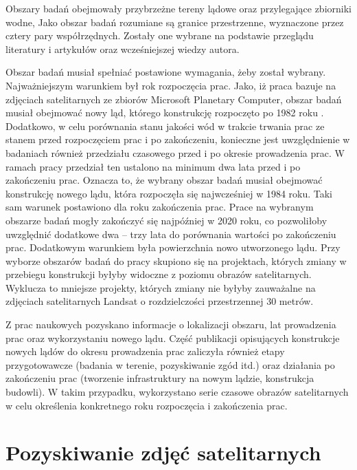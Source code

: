 \documentclass{amuthesis}
\begin{document}
Obszary badań obejmowały przybrzeżne tereny lądowe oraz przylegające
zbiorniki wodne, Jako obszar badań rozumiane są granice przestrzenne,
wyznaczone przez cztery pary współrzędnych. Zostały one wybrane na
podstawie przeglądu literatury i artykułów oraz wcześniejszej wiedzy
autora.

Obszar badań musiał spełniać postawione wymagania, żeby został wybrany.
Najważniejszym warunkiem był rok rozpoczęcia prac. Jako, iż praca bazuje
na zdjęciach satelitarnych ze zbiorów Microsoft Planetary Computer,
obszar badań musiał obejmować nowy ląd, którego konstrukcję rozpoczęto
po 1982 roku \autocite{microsoft_open_source_2022_7261897}. Dodatkowo, w
celu porównania stanu jakości wód w trakcie trwania prac ze stanem przed
rozpoczęciem prac i po zakończeniu, konieczne jest uwzględnienie w
badaniach również przedziału czasowego przed i po okresie prowadzenia
prac. W ramach pracy przedział ten ustalono na minimum dwa lata przed i
po zakończeniu prac. Oznacza to, że wybrany obszar badań musiał
obejmować konstrukcję nowego lądu, która rozpoczęła się najwcześniej w
1984 roku. Taki sam warunek postawiono dla roku zakończenia prac. Prace
na wybranym obszarze badań mogły zakończyć się najpóźniej w 2020 roku,
co pozwoliłoby uwzględnić dodatkowe dwa -- trzy lata do porównania
wartości po zakończeniu prac. Dodatkowym warunkiem była powierzchnia
nowo utworzonego lądu. Przy wyborze obszarów badań do pracy skupiono się
na projektach, których zmiany w przebiegu konstrukcji byłyby widoczne z
poziomu obrazów satelitarnych. Wyklucza to mniejsze projekty, których
zmiany nie byłyby zauważalne na zdjęciach satelitarnych Landsat o
rozdzielczości przestrzennej 30 metrów.

Z prac naukowych pozyskano informacje o lokalizacji obszaru, lat
prowadzenia prac oraz wykorzystaniu nowego lądu. Część publikacji
opisujących konstrukcje nowych lądów do okresu prowadzenia prac
zaliczyła również etapy przygotowawcze (badania w terenie, pozyskiwanie
zgód itd.) oraz działania po zakończeniu prac (tworzenie infrastruktury
na nowym lądzie, konstrukcja budowli). W takim przypadku, wykorzystano
serie czasowe obrazów satelitarnych w celu określenia konkretnego roku
rozpoczęcia i zakończenia prac.

\hypertarget{pozyskiwanie-zdjux119ux107-satelitarnych}{%
\section{Pozyskiwanie zdjęć
satelitarnych}\label{pozyskiwanie-zdjux119ux107-satelitarnych}}
\end{document}
